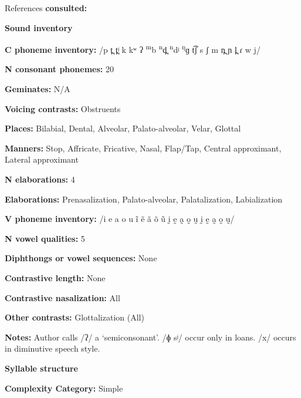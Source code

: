 References \textbf{consulted:} \citet{Bradley1971,Costello2014}



\textbf{Sound inventory}



\textbf{C phoneme inventory:} /p t̪ t̪ʲ k kʷ ʔ \textsuperscript{m}b \textsuperscript{n}d̪ \textsuperscript{n}dʲ \textsuperscript{ŋ}ɡ t͡ʃ s ʃ m n̪ ɲ l̪ ɾ w j/



\textbf{N consonant phonemes:} 20



\textbf{Geminates:} N/A



\textbf{Voicing contrasts:} Obstruents



\textbf{Places:} Bilabial, Dental, Alveolar, Palato-alveolar, Velar, Glottal



\textbf{Manners:} Stop, Affricate, Fricative, Nasal, Flap/Tap, Central approximant, Lateral approximant



\textbf{N elaborations:} 4



\textbf{Elaborations:} Prenasalization, Palato-alveolar, Palatalization, Labialization



\textbf{V phoneme inventory:} /i e a o u ĩ ẽ ã õ ũ ḭ ḛ a̰ o̰ ṵ ḭ ḛ a̰ o̰ ṵ/



\textbf{N vowel qualities:} 5



\textbf{Diphthongs or vowel sequences:} None



\textbf{Contrastive length:} None



\textbf{Contrastive nasalization:} All



\textbf{Other contrasts:} Glottalization (All)



\textbf{Notes:} Author calls /ʔ/ a ‘semiconsonant’. /ɸ sʲ/ occur only in  loans. /x/ occurs in diminutive speech style.



\textbf{Syllable structure}



\textbf{Complexity Category:} Simple



